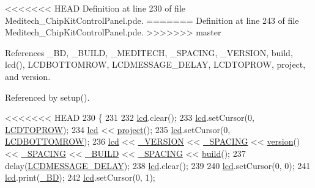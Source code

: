 \begin{DoxyCode}
\begin{DoxyCode}
\begin{DoxyCode}
\begin{DoxyCode}
<<<<<<< HEAD
Definition at line 230 of file Meditech\-\_\-\-Chip\-Kit\-Control\-Panel.\-pde.
=======
Definition at line 243 of file Meditech\-\_\-\-Chip\-Kit\-Control\-Panel.\-pde.
>>>>>>> master



References \-\_\-\-B\-D, \-\_\-\-B\-U\-I\-L\-D, \-\_\-\-M\-E\-D\-I\-T\-E\-C\-H, \-\_\-\-S\-P\-A\-C\-I\-N\-G, \-\_\-\-V\-E\-R\-S\-I\-O\-N, build, lcd(), L\-C\-D\-B\-O\-T\-T\-O\-M\-R\-O\-W, L\-C\-D\-M\-E\-S\-S\-A\-G\-E\-\_\-\-D\-E\-L\-A\-Y, L\-C\-D\-T\-O\-P\-R\-O\-W, project, and version.



Referenced by setup().


\begin{DoxyCode}
<<<<<<< HEAD
230                \{
231 
232   \hyperlink{_meditech___chip_kit_control_panel_8pde_ae0b100905fb0ed88dddaafda0aa05379}{lcd}.clear();
233   \hyperlink{_meditech___chip_kit_control_panel_8pde_ae0b100905fb0ed88dddaafda0aa05379}{lcd}.setCursor(0, \hyperlink{_l_c_d_8h_af51f2930b0a791ffa528731a5cac5756}{LCDTOPROW});
234   \hyperlink{_meditech___chip_kit_control_panel_8pde_ae0b100905fb0ed88dddaafda0aa05379}{lcd} << \hyperlink{_version_8h_aa9397d85369472e4b76a813648f20e46}{project}();
235   \hyperlink{_meditech___chip_kit_control_panel_8pde_ae0b100905fb0ed88dddaafda0aa05379}{lcd}.setCursor(0, \hyperlink{_l_c_d_8h_a46c173b564806ac8d8db0404f5036671}{LCDBOTTOMROW});
236   \hyperlink{_meditech___chip_kit_control_panel_8pde_ae0b100905fb0ed88dddaafda0aa05379}{lcd} << \hyperlink{_strings_8h_a069a1175d7ba5c8452e30b0213ed01c1}{\_VERSION} << \hyperlink{_strings_8h_abdf1c06d350b875620aa94f29a63526e}{\_SPACING} << \hyperlink{_version_8h_a2a79e63190ab37e5d6dafdd1eef5630f}{version}() << \hyperlink{_strings_8h_abdf1c06d350b875620aa94f29a63526e}{\_SPACING} << 
      \hyperlink{_strings_8h_aeb54c78fa1d4adc784d583e1ba8a1893}{\_BUILD} << \hyperlink{_strings_8h_abdf1c06d350b875620aa94f29a63526e}{\_SPACING} << \hyperlink{_version_8h_a2adc5cea78bc971f47b8553ecf51b89e}{build}(); 
237   delay(\hyperlink{_l_c_d_8h_a346f4cb5c01c503eb3f25e291ead40d8}{LCDMESSAGE\_DELAY});
238   \hyperlink{_meditech___chip_kit_control_panel_8pde_ae0b100905fb0ed88dddaafda0aa05379}{lcd}.clear();
239 
240   \hyperlink{_meditech___chip_kit_control_panel_8pde_ae0b100905fb0ed88dddaafda0aa05379}{lcd}.setCursor(0, 0);
241   \hyperlink{_meditech___chip_kit_control_panel_8pde_ae0b100905fb0ed88dddaafda0aa05379}{lcd}.print(\hyperlink{_strings_8h_a8191ea68252cd604b51e2e57594251e6}{\_BD});
242   \hyperlink{_meditech___chip_kit_control_panel_8pde_ae0b100905fb0ed88dddaafda0aa05379}{lcd}.setCursor(0, 1);

\end{DoxyCode}
\end{DoxyCode}
\end{DoxyCode}
\end{DoxyCode}
\end{DoxyCode}
